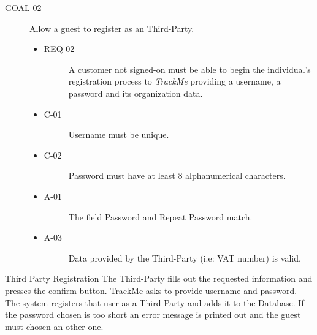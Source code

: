 \documentclass[a4paper]{article}
\newcommand{\requirement}{\ding{229}}%
\begin{document}
        \begin{description}
        	\item[GOAL-02] Allow a guest to register as an Third-Party.
            	\begin{itemize}
            	    \item[\requirement]
                	\begin{description}
                	\item[REQ-02]  A customer not signed-on must be able to begin the individual's registration process to \textit{TrackMe} providing a username, a password and its organization data.
                	\end{description}
                	\item
                	\begin{description}
                	\item[C-01] Username must be unique.
                	\end{description}
                	\item
                	\begin{description}
                	\item[C-02] Password must have at least 8 alphanumerical characters.
                	\end{description}
                	\item
                	\begin{description}
                	\item[A-01] The field Password and Repeat Password match.
                	\end{description}
            	    \item
                	\begin{description}
                	\item[A-03] Data provided by the Third-Party (i.e: VAT number) is valid.
                	\end{description}
                \end{itemize}
        \end{description}
        
        
        \begin{usecase}{Third Party Registration}
              {The Third-Party fills out the requested information and presses the confirm button.}
               {TrackMe asks to provide username and password.}
              {The system registers that user as a Third-Party and adds it to the  Database.}
        {If the password chosen is too short an error message is printed out and the guest must chosen an other one.}
      \end{usecase}
        
\end{document}
